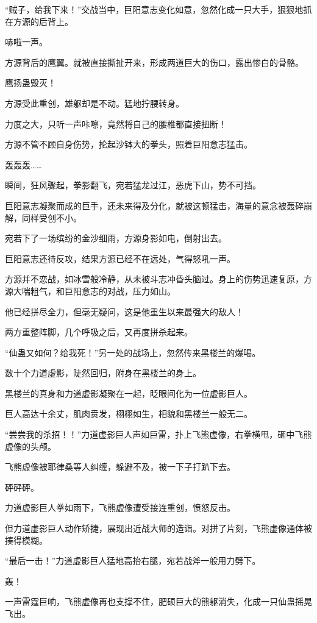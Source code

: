 \begin{this_body}
“贼子，给我下来！”交战当中，巨阳意志变化如意，忽然化成一只大手，狠狠地抓在方源的后背上。

哧啦一声。

方源背后的鹰翼。就被直接撕扯开来，形成两道巨大的伤口，露出惨白的骨骼。

鹰扬蛊毁灭！

方源受此重创，雄躯却是不动。猛地拧腰转身。

力度之大，只听一声咔嚓，竟然将自己的腰椎都直接扭断！

方源不管不顾自身伤势，抡起沙钵大的拳头，照着巨阳意志猛击。

轰轰轰……

瞬间，狂风骤起，拳影翻飞，宛若猛龙过江，恶虎下山，势不可挡。

巨阳意志凝聚而成的巨手，还未来得及分化，就被这顿猛击，海量的意念被轰碎崩解，同样受创不小。

宛若下了一场缤纷的金沙细雨，方源身影如电，倒射出去。

巨阳意志还待反攻，结果方源已经不在远处，气得怒吼一声。

方源并不恋战，如冰雪般冷静，从未被斗志冲昏头脑过。身上的伤势迅速复原，方源大喘粗气，和巨阳意志的对战，压力如山。

他已经拼尽全力，但毫无疑问，这是他重生以来最强大的敌人！

两方重整阵脚，几个呼吸之后，又再度拼杀起来。

“仙蛊又如何？给我死！”另一处的战场上，忽然传来黑楼兰的爆喝。

数十个力道虚影，陡然回归，附身在黑楼兰的身上。

黑楼兰的真身和力道虚影凝聚在一起，眨眼间化为一位虚影巨人。

巨人高达十余丈，肌肉贲发，栩栩如生，相貌和黑楼兰一般无二。

“尝尝我的杀招！！”力道虚影巨人声如巨雷，扑上飞熊虚像，右拳横甩，砸中飞熊虚像的头颅。

飞熊虚像被耶律桑等人纠缠，躲避不及，被一下子打趴下去。

砰砰砰。

力道虚影巨人拳如雨下，飞熊虚像遭受接连重创，愤怒反击。

但力道虚影巨人动作矫捷，展现出近战大师的造诣。对拼了片刻，飞熊虚像通体被揍得模糊。

“最后一击！”力道虚影巨人猛地高抬右腿，宛若战斧一般用力劈下。

轰！

一声雷霆巨响，飞熊虚像再也支撑不住，肥硕巨大的熊躯消失，化成一只仙蛊摇晃飞出。


\end{this_body}
